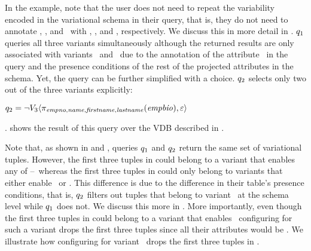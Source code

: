 In the example, note that the user does not need to repeat the variability  encoded
in the variational schema in their query, that is, they do not need to annotate \name,
\fname, and \lname\ with \vFour, \vFive, and \vFive, respectively. We discuss
this in more detail in . $\vQ_1$
queries all three variants simultaneously although the returned results are
only associated with variants \vFour\ and \vFive\ due to the annotation of the
attribute \empno\ in the query and the presence conditions of the rest of the
projected attributes in the schema.
%
Yet, the query can be further simplified with a choice. $\vQ_2$ selects only two
out of the three variants explicitly:\\
\centerline{\ensuremath{
\vQ_2=\chc[\neg \vThree]{\pi_{\empno,\name,\fname,\lname}(\empbio),\empRel}}}. 
%
 shows the result of this query over the VDB described in .
%



Note that, as shown in  and , 
queries $\vQ_1$ and $\vQ_2$ return the same set of variational tuples.
However, the first three tuples in  could belong to a variant that 
enables any of \vThree--\vFive\ whereas the first three tuples in 
could only belong to variants that either enable \vFour\ or \vFive. 
This difference is due to the difference in their table's presence conditions, 
that is, $\vQ_2$ filters out tuples that belong to variant \vThree\ at the schema 
level while $\vQ_1$ does not. We discuss this more in . 
More importantly, even though the first three tuples in  could 
belong to a variant that enables \vThree\ configuring 
for such a variant drops the first three tuples since all their attributes would 
be \nul. We illustrate how configuring  for variant \setDef \vThree\
drops the first three tuples in .
%


